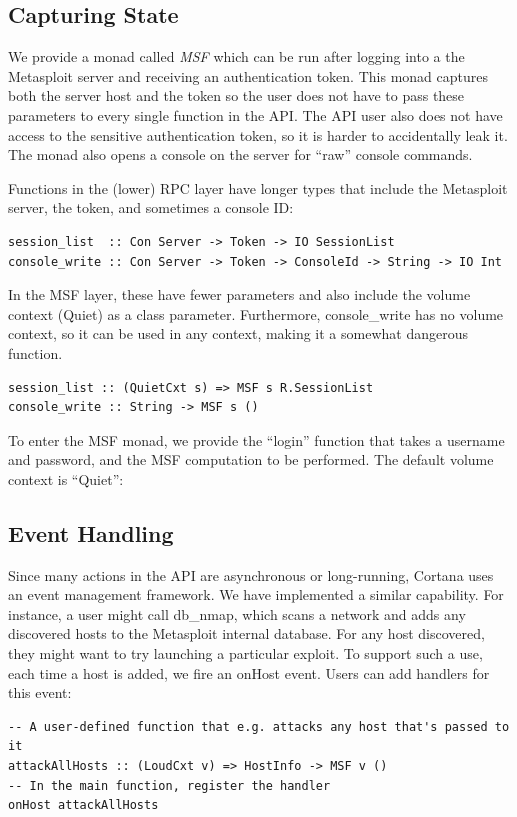 \documentclass[figure,letterpaper,onefignum]{mysiam}
\begin{document}
\subsection{Capturing State}
We provide a monad called \emph{MSF} which can be run after logging into a the Metasploit server and receiving an authentication token. This monad captures both the server host and the token so the user does not have to pass these parameters to every single function in the API. The API user also does not have access to the sensitive authentication token, so it is harder to accidentally leak it. The monad also opens a console on the server for ``raw'' console commands.

Functions in the (lower) RPC layer have longer types that include the Metasploit server, the token, and sometimes a console ID:

\begin{verbatim}
session_list  :: Con Server -> Token -> IO SessionList
console_write :: Con Server -> Token -> ConsoleId -> String -> IO Int
\end{verbatim}

In the MSF layer, these have fewer parameters and also include the volume context (Quiet) as a class parameter. Furthermore, console\_write has no volume context, so it can be used in any context, making it a somewhat dangerous function.
\begin{verbatim}
session_list :: (QuietCxt s) => MSF s R.SessionList
console_write :: String -> MSF s ()
\end{verbatim}

To enter the MSF monad, we provide the ``login'' function that takes a username and password, and the MSF computation to be performed. The default volume context is ``Quiet'':

\subsection{Event Handling}
Since many actions in the API are asynchronous or long-running, Cortana uses an event management framework. We have implemented a similar capability. For instance, a user might call db\_nmap, which scans a network and adds any discovered hosts to the Metasploit internal database. For any host discovered, they might want to try launching a particular exploit. To support such a use, each time a host is added, we fire an onHost event. Users can add handlers for this event:

\begin{verbatim}
-- A user-defined function that e.g. attacks any host that's passed to it
attackAllHosts :: (LoudCxt v) => HostInfo -> MSF v ()
-- In the main function, register the handler
onHost attackAllHosts
\end{verbatim}
\end{document}

